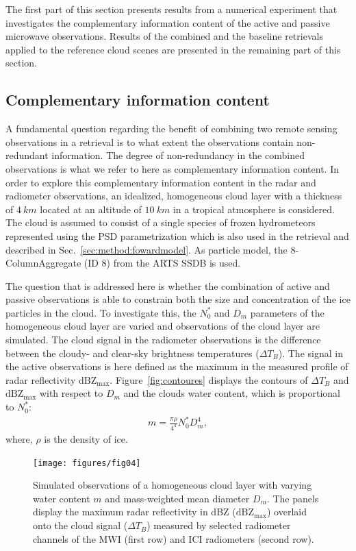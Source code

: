 \documentclass[journal abbreviation, manuscript]{copernicus}
\begin{document}
The first part of this section presents results from a numerical experiment 
that investigates the complementary information content of the active and passive
microwave observations. Results of the combined  and the baseline retrievals applied
to the reference cloud scenes are presented in the remaining part of this section.

\subsection{Complementary information content}
\label{sec:simple_cloud}

A fundamental question regarding the benefit of combining two remote sensing
observations in a retrieval is to what extent the observations contain
non-redundant information. The degree of non-redundancy in the combined
observations is what we refer to here as complementary information content.
In order to explore this complementary information content in the radar and
radiometer observations, an idealized, homogeneous cloud layer with a thickness
of $4\ \unit{km}$ located at an altitude of $10\ \unit{km}$ in a tropical
atmosphere is considered. The cloud is assumed to consist of a single species of
frozen hydrometeors represented using the PSD parametrization which is also used
in the retrieval and described in Sec.~\ref{sec:method:fowardmodel}. As particle
model, the 8-ColumnAggregate (ID 8) from the ARTS SSDB is used.

The question that is addressed here is whether the combination of active and
passive observations is able to constrain both the size and concentration of the
ice particles in the cloud. To investigate this, the $N_0^*$ and $D_m$
parameters of the homogeneous cloud layer are varied and observations of the
cloud layer are simulated. The cloud signal in the radiometer observations is
the difference between the cloudy- and clear-sky brightness temperatures
($\Delta T_B$). The signal in the active observations is here defined as the
maximum in the measured profile of radar reflectivity $\text{dBZ}_\text{max}$.
Figure~\ref{fig:contoures} displays the contours of $\Delta T_B$ and
$\text{dBZ}_\text{max}$ with respect to $D_m$ and the clouds water content, which is
proportional to $N_0^*$:
\begin{align}
m = \frac{\pi \rho}{4 ^ 4}N_0^* D_m^4,
\end{align}
where, $\rho$ is the density of ice.

\begin{figure}
\centering
\texttt{[image: figures/fig04]}
\caption{Simulated observations of a homogeneous cloud layer with varying water
  content $m$ and mass-weighted mean diameter $D_m$. The panels display the
  maximum radar reflectivity in dBZ ($\text{dBZ}_\text{max}$) overlaid onto the
  cloud signal ($\Delta T_B$) measured by selected radiometer channels of the
  MWI (first row) and ICI radiometers (second row).}
\label{fig:contours}
\end{figure}
\end{document}
